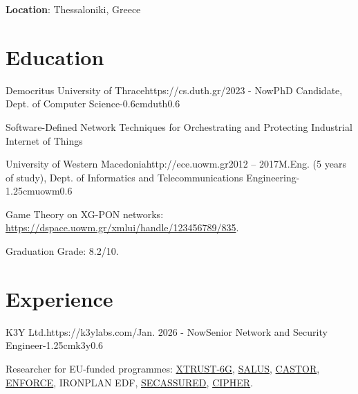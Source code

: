 \documentclass{mycv}
\begin{document}
	\thispagestyle{plain}

	\textbf{Location}: Thessaloniki, Greece

    \section{Education}
	\begin{EntryDatedLogo}{Democritus University of Thrace}{https://cs.duth.gr/}{2023 - Now}{PhD Candidate, Dept. of Computer Science}{-0.6cm}{duth}{0.6}
		\begin{Itemize}
			\item Software-Defined Network Techniques for Orchestrating and Protecting Industrial Internet of Things
		\end{Itemize}
	\end{EntryDatedLogo}

	\vspace*{0.5cm}
	
	\begin{EntryDatedLogo}{University of Western Macedonia}{http://ece.uowm.gr}{2012 -- 2017}{M.Eng. (5 years of study), Dept. of Informatics and Telecommunications Engineering}{-1.25cm}{uowm}{0.6}
		\begin{Itemize}
			\item Game Theory on XG-PON networks: \url{https://dspace.uowm.gr/xmlui/handle/123456789/835}.
			\item Graduation Grade: 8.2/10.
		\end{Itemize}
	\end{EntryDatedLogo}
	
	\section{Experience}
	\begin{EntryDatedLogo}{K3Y Ltd.}{https://k3ylabs.com/}{Jan. 2026 - Now}{Senior Network and Security Engineer}{-1.25cm}{k3y}{0.6}
		\begin{Itemize}
			\item Researcher for EU-funded programmes: \href{https://cordis.europa.eu/project/id/101192749}{XTRUST-6G}, \href{https://cordis.europa.eu/project/id/101225719}{SALUS}, \href{https://cordis.europa.eu/project/id/101167904}{CASTOR}, \href{https://enforceproject.eu/}{ENFORCE}, IRONPLAN EDF, \href{https://cordis.europa.eu/project/id/101225858}{SECASSURED}, \href{https://cipher-eu.com/}{CIPHER}.
		\end{Itemize}
	\end{EntryDatedLogo}
\end{document}
